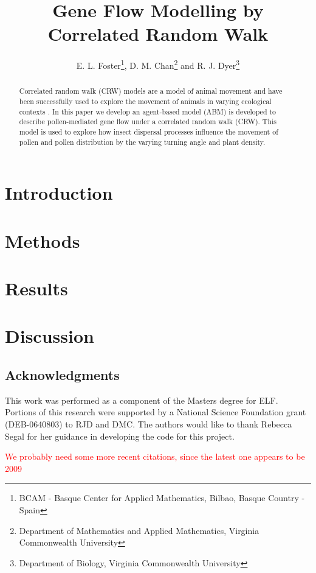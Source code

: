 \documentclass{article}
\title{Gene Flow Modelling by Correlated Random Walk}
\author{E. L. Foster\thanks{BCAM - Basque Center for Applied Mathematics,
Bilbao, Basque Country - Spain}, D. M. Chan\thanks{Department of Mathematics and
Applied Mathematics, Virginia Commonwealth University} and R. J.
Dyer\thanks{Department of Biology, Virginia Commonwealth University}}
\begin{document}
\maketitle

\begin{abstract} 
  Correlated random walk (CRW) models are a model of animal movement
  \cite{Prasad05} and have been successfully used to explore the movement of
  animals in varying ecological contexts \cite{Bartumeus07}. In this paper we
  develop an agent-based model (ABM) is developed to describe pollen-mediated
  gene flow under a correlated random walk (CRW). This model is used to explore
  how insect dispersal processes influence the movement of pollen and pollen
  distribution by the varying turning angle and plant density.
\end{abstract}

\section{Introduction}
  
\section{Methods}
  
\section{Results}
  
\section{Discussion}
  
\subsection*{Acknowledgments}
This work was performed as a component of the Masters degree for ELF.  Portions
of this research were supported by a National Science Foundation grant
(DEB-0640803) to RJD and DMC. The authors would like to thank Rebecca Segal for
her guidance in developing the code for this project.

\textcolor{red}{We probably need some more recent citations, since the latest
one appears to be 2009}



\end{document}
